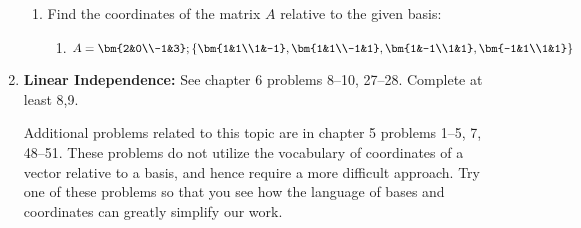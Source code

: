 \begin{enumerate}
\begin{enumerate}
	\item Find the coordinates of the matrix $A$ relative to the given basis:
		\begin{enumerate}
			\item $A=\bm{2&0\\-1&3};\left\{\bm{1&1\\1&-1},\bm{1&1\\-1&1},\bm{1&-1\\1&1},\bm{-1&1\\1&1}\right\}$
                  \end{enumerate}
	
\end{enumerate}

\item \textbf{Linear Independence:} \label{independence problems}
See chapter 6 problems 8--10, 27--28.  
Complete at least 8,9.	

Additional problems related to this topic are in chapter 5 problems 1--5, 7, 48--51. These problems do not utilize the vocabulary of coordinates of a vector relative to a basis, and hence require a more difficult approach.  Try one of these problems so that you see how the language of bases and coordinates can greatly simplify our work.


\end{enumerate}
